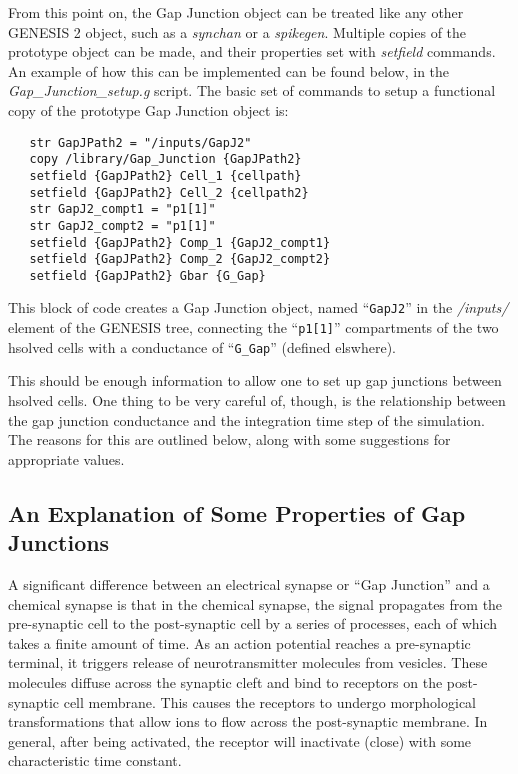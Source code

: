 \documentclass[12pt]{article}
\begin{document}
From this point on, the Gap Junction object can be treated like any other GENESIS 2 object, such as a {\it synchan} or a {\it spikegen}. Multiple copies of the prototype object can be made, and their properties set with {\it setfield} commands. An example of how this can be implemented can be found below, in the {\it Gap\_Junction\_setup.g} script. The basic set of commands to setup a functional copy of the prototype Gap Junction object is:
\begin{verbatim}
   str GapJPath2 = "/inputs/GapJ2"
   copy /library/Gap_Junction {GapJPath2}
   setfield {GapJPath2} Cell_1 {cellpath}
   setfield {GapJPath2} Cell_2 {cellpath2}
   str GapJ2_compt1 = "p1[1]"
   str GapJ2_compt2 = "p1[1]"
   setfield {GapJPath2} Comp_1 {GapJ2_compt1}
   setfield {GapJPath2} Comp_2 {GapJ2_compt2}
   setfield {GapJPath2} Gbar {G_Gap}
\end{verbatim}
This block of code creates a Gap Junction object, named ``{\tt GapJ2}'' in the {\it /inputs/} element of the GENESIS tree, connecting the ``{\tt p1[1]}'' compartments of the two hsolved cells with a conductance of ``{\tt G\_Gap}'' (defined elswhere).

This should be enough information to allow one to set up gap junctions between hsolved cells. One thing to be very careful of, though, is the relationship between the gap junction conductance and the integration time step of the simulation. The reasons for this are outlined below, along with some suggestions for appropriate values.

\subsection*{An Explanation of Some Properties of Gap Junctions}

A significant difference between an electrical synapse or ``Gap Junction'' and a chemical synapse is that in the chemical synapse, the signal propagates from the pre-synaptic cell to the post-synaptic cell by a series of processes, each of which takes a finite amount of time. As an action potential reaches a pre-synaptic terminal, it triggers release of neurotransmitter molecules from vesicles. These molecules diffuse across the synaptic cleft and bind to receptors on the post-synaptic cell membrane. This causes the receptors to undergo morphological transformations that allow ions to flow across the post-synaptic membrane. In general, after being activated, the receptor will inactivate (close) with some characteristic time constant.
\end{document}
